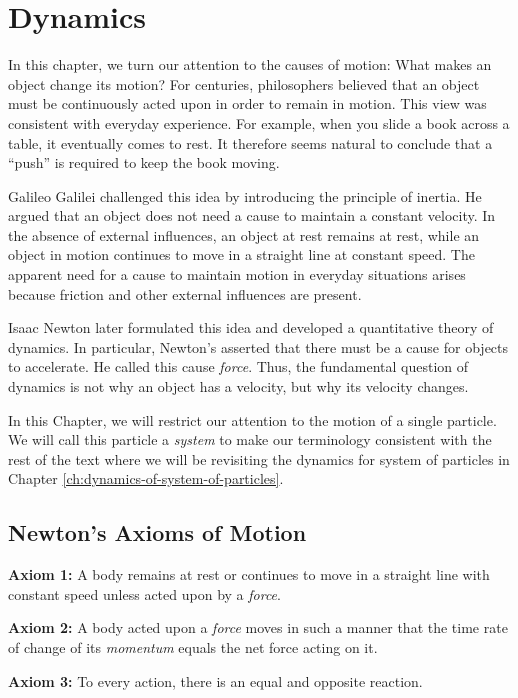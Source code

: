 \documentclass[../main.tex]{subfiles}
\begin{document}
\chapter{Dynamics}

In this chapter, we turn our attention to the causes of motion: What makes an object change its motion? For centuries, philosophers believed that an object must be continuously acted upon in order to remain in motion. This view was consistent with everyday experience. For example, when you slide a book across a table, it eventually comes to rest. It therefore seems natural to conclude that a ``push'' is required to keep the book moving.

Galileo Galilei challenged this idea by introducing the principle of inertia. He argued that an object does not need a cause to maintain a constant velocity. In the absence of external influences, an object at rest remains at rest, while an object in motion continues to move in a straight line at constant speed. The apparent need for a cause to maintain motion in everyday situations arises because friction and other external influences are present.

Isaac Newton later formulated this idea and developed a quantitative theory of dynamics. In particular, Newton's asserted that there must be a cause for objects to accelerate. He called this cause \emph{force}. Thus, the fundamental question of dynamics is not why an object has a velocity, but why its velocity changes.

In this Chapter, we will restrict our attention to the motion of a single particle. We will call this particle a \emph{system} to make our terminology consistent with the rest of the text where we will be revisiting the dynamics for system of particles in Chapter \ref{ch:dynamics-of-system-of-particles}.

\section{Newton's Axioms of Motion}

\textbf{Axiom 1:} A body remains at rest or continues to move in a straight line with constant speed unless acted upon by a \emph{force}. 

\textbf{Axiom 2:} A body acted upon a \emph{force} moves in such a manner that the time rate of change of its \emph{momentum} equals the net force acting on it.

\textbf{Axiom 3:}  To every action, there is an equal and opposite reaction. 
\end{document}
